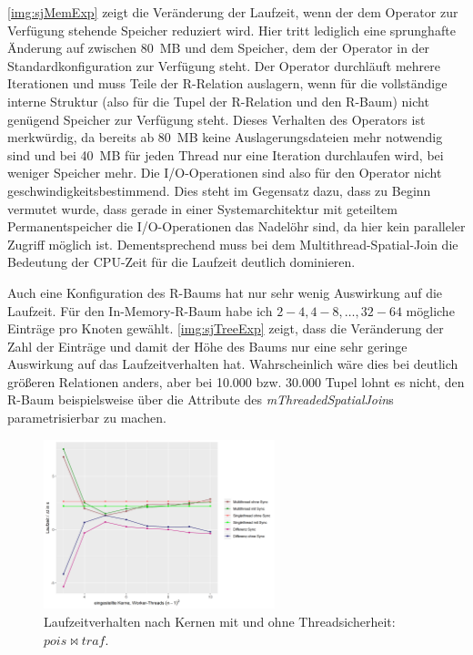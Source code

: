 \documentclass[a4paper,12pt,twoside]{article}
\newcommand{\Fb}[1]{\textit{#1}} %
\begin{document}
\autoref{img:sjMemExp} zeigt die Veränderung der Laufzeit, wenn der dem Operator zur Verfügung stehende Speicher reduziert wird. Hier tritt lediglich eine sprunghafte Änderung auf zwischen 80~MB und dem Speicher, dem der Operator in der Standardkonfiguration zur Verfügung steht. Der Operator durchläuft mehrere Iterationen und muss Teile der R-Relation auslagern, wenn für die vollständige interne Struktur (also für die Tupel der R-Relation und den R-Baum) nicht genügend Speicher zur Verfügung steht. Dieses Verhalten des Operators ist merkwürdig, da bereits ab 80~MB keine Auslagerungsdateien mehr notwendig sind und bei 40~MB für jeden Thread nur eine Iteration durchlaufen wird, bei weniger Speicher mehr. Die I/O-Operationen sind also für den Operator nicht geschwindigkeitsbestimmend. Dies steht im Gegensatz dazu, dass zu Beginn vermutet wurde, dass gerade in einer Systemarchitektur mit geteiltem Permanentspeicher die I/O-Operationen das Nadelöhr sind, da hier kein paralleler Zugriff möglich ist. Dementsprechend muss bei dem Multithread-Spatial-Join die Bedeutung der CPU-Zeit für die Laufzeit deutlich dominieren.

Auch eine Konfiguration des R-Baums hat nur sehr wenig Auswirkung auf die Laufzeit. Für den In-Memory-R-Baum habe ich $2-4, 4-8, \ldots, 32-64$ mögliche Einträge pro Knoten gewählt. \autoref{img:sjTreeExp} zeigt, dass die Veränderung der Zahl der Einträge und damit der Höhe des Baums nur eine sehr geringe Auswirkung auf das Laufzeitverhalten hat. Wahrscheinlich wäre dies bei deutlich größeren Relationen anders, aber bei 10.000 bzw. 30.000 Tupel lohnt es nicht, den R-Baum beispielsweise über die Attribute des \Fb{mThreadedSpatialJoin}s parametrisierbar zu machen.   

\begin{figure}
	\centering
	\includegraphics[width=0.6\textwidth]{Bilder/sj_nosync.png}
	\caption{Laufzeitverhalten nach Kernen mit und ohne Threadsicherheit: $pois \bowtie traf$.}
	\label{img:sjSync}
\end{figure}
\end{document}
